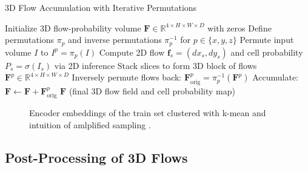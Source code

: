 \begin{algorithm}
\caption{3D Flow Accumulation with Iterative Permutations}
\label{algo:3dflows}
\begin{algorithmic}[1]
\STATE Initialize 3D flow-probability volume $\mathbf{F} \in \mathbb{R}^{4 \times H \times W \times D}$ with zeros
\STATE Define permutations $\pi_p$ and inverse permutations $\pi_p^{-1}$ for $p \in \{x,y,z\}$
    \STATE Permute input volume $I$ to $I^p = \pi_p(I)$
        \STATE Compute 2D flow $\mathbf{f}_s = (dx_s, dy_s)$ and cell probability $P_s = \sigma(I_s)$ via 2D inference
    \ENDFOR
    \STATE Stack slices to form 3D block of flows $\mathbf{F}^p \in \mathbb{R}^{4 \times H \times W \times D}$
    \STATE Inversely permute flows back: $\mathbf{F}^{p}_{\text{orig}} = \pi_p^{-1}(\mathbf{F}^p)$
    \STATE Accumulate: $\mathbf{F} \gets \mathbf{F} + \mathbf{F}^{p}_{\text{orig}}$
\ENDFOR
\RETURN $\mathbf{F}$ (final 3D flow field and cell probability map)
\end{algorithmic}
\end{algorithm}
\begin{figure}[!ht]
    \centering
    \caption{Encoder embeddings of the train set clustered with k-mean and intuition of amlplified sampling \cite{LeCun.1989}.}
    \label{fig:slicing}
\end{figure}

\subsection{Post-Processing of 3D Flows} %

